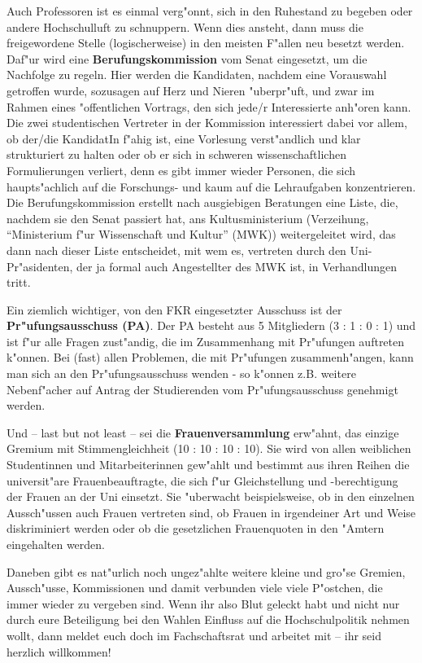 Auch Professoren ist es einmal verg"onnt, sich in den Ruhestand zu begeben oder 
andere Hochschulluft zu schnuppern. Wenn dies ansteht, dann muss die 
freigewordene Stelle (logischerweise) in den meisten F"allen neu besetzt 
werden. Daf"ur wird eine \textbf{Berufungskommission} vom Senat eingesetzt, um 
die Nachfolge zu regeln. Hier werden die Kandidaten, nachdem eine Vorauswahl 
getroffen wurde, sozusagen auf Herz und Nieren "uberpr"uft, und zwar im Rahmen 
eines "offentlichen Vortrags, den sich jede/r Interessierte anh"oren kann. Die 
zwei studentischen Vertreter in der Kommission interessiert dabei vor allem, ob 
der/die KandidatIn f"ahig ist, eine Vorlesung verst"andlich und klar 
strukturiert zu halten oder ob er sich in schweren wissenschaftlichen 
Formulierungen verliert, denn es gibt immer wieder Personen, die sich
haupts"achlich auf die Forschungs- und kaum auf die Lehraufgaben konzentrieren.
Die Berufungskommission 
erstellt nach ausgiebigen Beratungen eine Liste, die, nachdem sie den Senat 
passiert hat, ans Kultusministerium (Verzeihung, "`Ministerium f"ur 
Wissenschaft und Kultur"' (MWK)) weitergeleitet wird, das dann nach dieser 
Liste entscheidet, mit wem es, vertreten durch den Uni-Pr"asidenten, der ja 
formal auch Angestellter des MWK ist, in Verhandlungen tritt.

Ein ziemlich wichtiger, von den FKR eingesetzter Ausschuss ist der 
\textbf{Pr"ufungsausschuss (PA)}. Der PA besteht aus 5 Mitgliedern (3 : 1 : 0 : 
1)
und ist f"ur alle Fragen zust"andig, die im Zusammenhang mit Pr"ufungen
auftreten k"onnen. Bei (fast) allen Problemen, die mit Pr"ufungen 
zusammenh"angen, kann
man sich an den Pr"ufungsausschuss wenden - so k"onnen z.B. weitere
Nebenf"acher auf Antrag der Studierenden vom Pr"ufungsausschuss genehmigt
werden. 

Und -- last but not least -- sei die \textbf{Frauenversammlung} erw"ahnt, das 
einzige Gremium mit Stimmengleichheit (10 : 10 : 10 : 10). Sie wird von allen 
weiblichen Studentinnen und Mitarbeiterinnen gew"ahlt und bestimmt aus ihren 
Reihen die universit"are Frauenbeauftragte, die sich f"ur Gleichstellung und 
-berechtigung der Frauen an der Uni einsetzt. Sie "uberwacht beispielsweise, ob 
in den einzelnen Aussch"ussen auch Frauen vertreten sind, ob Frauen in 
irgendeiner Art und Weise diskriminiert werden oder ob die gesetzlichen 
Frauenquoten in den "Amtern eingehalten werden. 

Daneben gibt es nat"urlich noch ungez"ahlte weitere kleine und gro"se Gremien, 
Aussch"usse, Kommissionen und damit verbunden viele viele P"ostchen, die immer 
wieder zu vergeben sind. Wenn ihr also Blut geleckt habt und nicht nur durch 
eure Beteiligung bei den Wahlen Einfluss auf die Hochschulpolitik nehmen wollt, 
dann meldet euch doch im Fachschaftsrat und arbeitet mit -- ihr seid herzlich 
willkommen!

